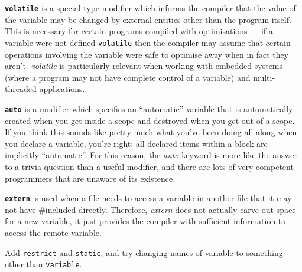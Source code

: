 \textbf{\texttt{volatile}} is a special type modifier which informs the
compiler that the value of the variable may be changed by external entities
other than the program itself. This is necessary for certain programs compiled
with optimisations --- if a variable were not defined \texttt{volatile} then
the compiler may assume that certain operations involving the variable were
safe to optimise away when in fact they aren't. \emph{volatile} is particularly
relevant when working with embedded systems (where a program may not have
complete control of a variable) and multi-threaded applications.

\textbf{\texttt{auto}} is a modifier which specifies an ``automatic'' variable
that is automatically created when you get inside a scope and destroyed when
you get out of a scope. If you think this sounds like pretty much what you've
been doing all along when you declare a variable, you're right: all declared
items within a block are implicitly ``automatic''. For this reason, the
\emph{auto} keyword is more like the answer to a trivia question than a useful
modifier, and there are lots of very competent programmers that are unaware of
its existence.

\textbf{\texttt{extern}} is used when a file needs to access a variable in
another file that it may not have \#included directly. Therefore, \emph{extern}
does not actually carve out space for a new variable, it just provides the
compiler with sufficient information to access the remote variable.

Add \texttt{restrict} and \texttt{static}, and try changing names of variable
to something other than \texttt{variable}.
